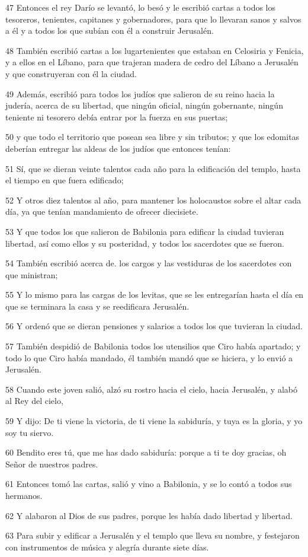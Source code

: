 \par 47 Entonces el rey Darío se levantó, lo besó y le escribió cartas a todos los tesoreros, tenientes, capitanes y gobernadores, para que lo llevaran sanos y salvos a él y a todos los que subían con él a construir Jerusalén.
\par 48 También escribió cartas a los lugartenientes que estaban en Celosiria y Fenicia, y a ellos en el Líbano, para que trajeran madera de cedro del Líbano a Jerusalén y que construyeran con él la ciudad.
\par 49 Además, escribió para todos los judíos que salieron de su reino hacia la judería, acerca de su libertad, que ningún oficial, ningún gobernante, ningún teniente ni tesorero debía entrar por la fuerza en sus puertas;
\par 50 y que todo el territorio que posean sea libre y sin tributos; y que los edomitas deberían entregar las aldeas de los judíos que entonces tenían:
\par 51 Sí, que se dieran veinte talentos cada año para la edificación del templo, hasta el tiempo en que fuera edificado;
\par 52 Y otros diez talentos al año, para mantener los holocaustos sobre el altar cada día, ya que tenían mandamiento de ofrecer diecisiete.
\par 53 Y que todos los que salieron de Babilonia para edificar la ciudad tuvieran libertad, así como ellos y su posteridad, y todos los sacerdotes que se fueron.
\par 54 También escribió acerca de. los cargos y las vestiduras de los sacerdotes con que ministran;
\par 55 Y lo mismo para las cargas de los levitas, que se les entregarían hasta el día en que se terminara la casa y se reedificara Jerusalén.
\par 56 Y ordenó que se dieran pensiones y salarios a todos los que tuvieran la ciudad.
\par 57 También despidió de Babilonia todos los utensilios que Ciro había apartado; y todo lo que Ciro había mandado, él también mandó que se hiciera, y lo envió a Jerusalén.
\par 58 Cuando este joven salió, alzó su rostro hacia el cielo, hacia Jerusalén, y alabó al Rey del cielo,
\par 59 Y dijo: De ti viene la victoria, de ti viene la sabiduría, y tuya es la gloria, y yo soy tu siervo.
\par 60 Bendito eres tú, que me has dado sabiduría: porque a ti te doy gracias, oh Señor de nuestros padres.
\par 61 Entonces tomó las cartas, salió y vino a Babilonia, y se lo contó a todos sus hermanos.
\par 62 Y alabaron al Dios de sus padres, porque les había dado libertad y libertad.
\par 63 Para subir y edificar a Jerusalén y el templo que lleva su nombre, y festejaron con instrumentos de música y alegría durante siete días.

